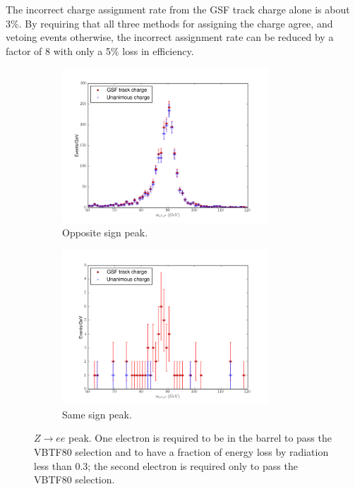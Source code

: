 The incorrect charge assignment rate from the GSF track charge alone is about
\unit{3}{\%}.  By requiring that all three methods for assigning the charge
agree, and vetoing events otherwise, the incorrect assignment rate can be
reduced by a factor of 8 with only a \unit{5}{\%} loss in efficiency.

\begin{figure}[htbp]
  \centering
  \begin{subfigure}{\textwidth}
    \centering
    \includegraphics[width=0.85\textwidth]{zpeak_os}
    \caption{Opposite sign \PZ peak.}
    \label{fig:zpeak_os}
  \end{subfigure}
  \begin{subfigure}{\textwidth}
    \centering
    \includegraphics[width=0.85\textwidth]{zpeak_ss}
    \caption{Same sign \PZ peak.}
    \label{fig:zpeak_ss}
  \end{subfigure}
  \caption{ $Z\rightarrow ee$ peak. One electron is required to be in the
barrel to pass the VBTF80 selection and to have a fraction of energy loss by
radiation less than 0.3; the second electron is required only to pass the VBTF80
selection.}\label{fig:zpeak} 
\end{figure}

